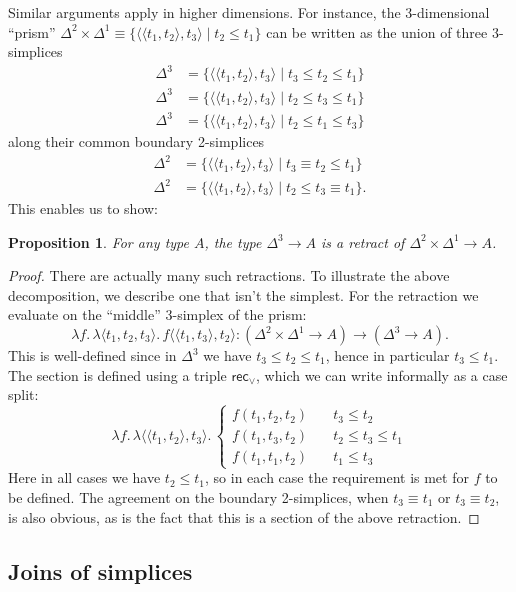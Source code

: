\documentclass[12pt]{amsart}
\theoremstyle{plain}
\newtheorem{prop}[thm]{Proposition}
\theoremstyle{definition}
\theoremstyle{remark}
\numberwithin{equation}{section}
\newcommand{\jdeq}{\equiv}
\newcommand{\sh}[2]{\{#1\mid #2\}}
\newcommand{\pair}[1]{\langle #1\rangle}
\newcommand{\rec}{\mathsf{rec}}
\newcommand{\lam}[1]{\lambda #1.\,}
\begin{document}
Similar arguments apply in higher dimensions.
For instance, the 3-dimensional ``prism'' $\Delta^2\times\Delta^1 \jdeq \sh{\pair{\pair{t_1,t_2},t_3}}{t_2\le t_1}$ can be written as the union of three 3-simplices
\begin{align*}
  \Delta^3 &= \sh{\pair{\pair{t_1,t_2},t_3}}{t_3 \le t_2\le t_1}\\
  \Delta^3 &= \sh{\pair{\pair{t_1,t_2},t_3}}{t_2 \le t_3\le t_1}\\
  \Delta^3 &= \sh{\pair{\pair{t_1,t_2},t_3}}{t_2 \le t_1\le t_3}
\end{align*}
along their common boundary 2-simplices
\begin{align*}
  \Delta^2 &= \sh{\pair{\pair{t_1,t_2},t_3}}{t_3 \jdeq t_2\le t_1}\\
  \Delta^2 &= \sh{\pair{\pair{t_1,t_2},t_3}}{t_2\le t_3 \jdeq t_1}.
\end{align*}
This enables us to show:

\begin{prop}
  For any type $A$, the type $\Delta^3\to A$ is a retract of $\Delta^2\times\Delta^1 \to A$.
\end{prop}
\begin{proof}
  There are actually many such retractions.
  To illustrate the above decomposition, we describe one that isn't the simplest.
  For the retraction we evaluate on the ``middle'' 3-simplex of the prism:
  \[\lam{f} \lam{\pair{t_1,t_2,t_3}} f\pair{\pair{t_1,t_3},t_2} : (\Delta^2\times\Delta^1 \to A) \to (\Delta^3\to A). \]
  This is well-defined since in $\Delta^3$ we have $t_3\le t_2\le t_1$, hence in particular $t_3\le t_1$.
  The section is defined using a triple $\rec_\lor$, which we can write informally as a case split:
  \[ \lam{f}\lam{\pair{\pair{t_1,t_2},t_3}}
  \begin{cases}
    f(t_1,t_2,t_2) &\quad t_3\le t_2\\
    f(t_1,t_3,t_2) &\quad t_2\le t_3 \le t_1\\
    f(t_1,t_1,t_2) &\quad t_1\le t_3
  \end{cases}
  \]
  Here in all cases we have $t_2\le t_1$, so in each case the requirement is met for $f$ to be defined.
  The agreement on the boundary 2-simplices, when $t_3\jdeq t_1$ or $t_3\jdeq t_2$, is also obvious, as is the fact that this is a section of the above retraction.
\end{proof}


\subsection{Joins of simplices}
\label{sec:join}
\end{document}
